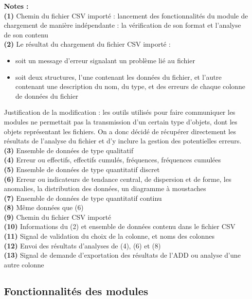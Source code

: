 		\textbf{Notes :}\\
			\textbf{({\color{red}1})} Chemin du fichier CSV importé : lancement des fonctionnalités du module de chargement de manière indépendante : la vérification de son format et l'analyse de son contenu\\
			\textbf{({\color{red}2})} Le résultat du chargement du fichier CSV importé :
			\begin{itemize}
				\item soit un message d'erreur signalant un problème lié au fichier
				\item soit deux structures, l'une contenant les données du fichier, et l'autre contenant une description du nom, du type, et des erreurs de chaque colonne de données du fichier
			\end{itemize}
			{\color{red}Justification de la modification :} les outils utilisés pour faire communiquer les modules ne permettait pas la transmission d'un certain type d'objets, dont les objets représentant les fichiers. On a donc décidé de récupérer directement les résultats de l'analyse du fichier et d'y inclure la gestion des potentielles erreurs.\\
			\textbf{(3)} Ensemble de données de type qualitatif\\
			\textbf{(4)} Erreur ou effectifs, effectifs cumulés, fréquences, fréquences cumulées\\
			\textbf{(5)} Ensemble de données de type quantitatif discret\\
			\textbf{(6)} Erreur ou indicateurs de tendance central, de dispersion et de forme, les anomalies, la distribution des données, un diagramme à moustaches\\
			\textbf{(7)} Ensemble de données de type quantitatif continu\\
			\textbf{(8)} Même données que (6)\\
			\textbf{(9)} Chemin du fichier CSV importé \\
			\textbf{(10)} Informations du (2) et ensemble de données contenu dans le fichier CSV \\
			\textbf{(11)} Signal de validation du choix de la colonne, et noms des colonnes\\
			\textbf{(12)} Envoi des résultats d'analyses de (4), (6) et (8)\\
			\textbf{(13)} Signal de demande d'exportation des résultats de l'ADD ou analyse d'une autre colonne\\		
		
		\subsection{Fonctionnalités des modules}
	
